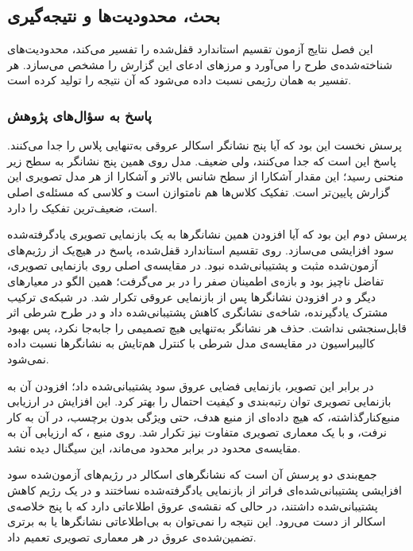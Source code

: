 \subsection{بحث، محدودیت‌ها و نتیجه‌گیری}

این فصل نتایج آزمون تقسیم استاندارد قفل‌شده را تفسیر می‌کند، محدودیت‌های شناخته‌شده‌ی طرح را می‌آورد و مرزهای ادعای این گزارش را مشخص می‌سازد. هر تفسیر به همان رژیمی نسبت داده می‌شود که آن نتیجه را تولید کرده است.

\subsubsection{پاسخ به سؤال‌های پژوهش}

پرسش نخست این بود که آیا پنج نشانگر اسکالر عروقی به‌تنهایی پلاس را جدا می‌کنند. پاسخ این است که جدا می‌کنند، ولی ضعیف. مدل  روی همین پنج نشانگر به سطح زیر منحنی  رسید؛ این مقدار آشکارا از سطح شانس بالاتر و آشکارا از هر مدل تصویری این گزارش پایین‌تر است. تفکیک کلاس‌ها هم نامتوازن است و کلاسی که مسئله‌ی اصلی است، ضعیف‌ترین تفکیک را دارد.

پرسش دوم این بود که آیا افزودن همین نشانگرها به یک بازنمایی تصویری یادگرفته‌شده سود افزایشی می‌سازد. روی تقسیم استاندارد قفل‌شده، پاسخ در هیچ‌یک از رژیم‌های آزمون‌شده مثبت و پشتیبانی‌شده نبود. در مقایسه‌ی اصلی روی بازنمایی تصویری، تفاضل ناچیز بود و بازه‌ی اطمینان صفر را در بر می‌گرفت؛ همین الگو در معیارهای دیگر و در افزودن نشانگرها پس از بازنمایی عروقی تکرار شد. در شبکه‌ی ترکیب مشترک یادگیرنده، شاخه‌ی نشانگری کاهش پشتیبانی‌شده داد و در طرح شرطی  اثر قابل‌سنجشی نداشت. حذف هر نشانگر به‌تنهایی هیچ تصمیمی را جابه‌جا نکرد، پس بهبود کالیبراسیون در مقایسه‌ی مدل شرطی با کنترل هم‌تایش به نشانگرها نسبت داده نمی‌شود.

در برابر این تصویر، بازنمایی فضایی عروق سود پشتیبانی‌شده داد؛ افزودن آن به بازنمایی تصویری توان رتبه‌بندی و کیفیت احتمال را بهتر کرد. این افزایش در ارزیابی منبع‌کنارگذاشته، که هیچ داده‌ای از منبع هدف، حتی ویژگی بدون برچسب، در آن به کار نرفت، و با یک معماری تصویری متفاوت نیز تکرار شد. روی منبع ، که ارزیابی آن به مقایسه‌ی محدود  در برابر  محدود می‌ماند، این سیگنال دیده نشد.

جمع‌بندی دو پرسش آن است که نشانگرهای اسکالر در رژیم‌های آزمون‌شده سود افزایشی پشتیبانی‌شده‌ای فراتر از بازنمایی یادگرفته‌شده نساختند و در یک رژیم کاهش پشتیبانی‌شده داشتند، در حالی که نقشه‌ی عروق اطلاعاتی دارد که با پنج خلاصه‌ی اسکالر از دست می‌رود. این نتیجه را نمی‌توان به بی‌اطلاعاتی نشانگرها یا به برتری تضمین‌شده‌ی عروق در هر معماری تصویری تعمیم داد.

